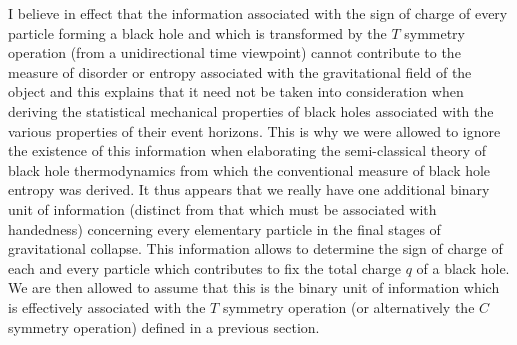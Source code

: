 \documentclass[notitlepage,12pt]{report}
\begin{document}
I believe in effect that the information associated with the sign of charge of every particle forming a black hole and which is transformed by the $T$ symmetry operation (from a unidirectional time viewpoint) cannot contribute to the measure of disorder or entropy associated with the gravitational field of the object and this explains that it need not be taken into consideration when deriving the statistical mechanical properties of black holes associated with the various properties of their event horizons. This is why we were allowed to ignore the existence of this information when elaborating the semi-classical theory of black hole thermodynamics from which the conventional measure of black hole entropy was derived. It thus appears that we really have one additional binary unit of information (distinct from that which must be associated with handedness) concerning every elementary particle in the final stages of gravitational collapse. This information allows to determine the sign of charge of each and every particle which contributes to fix the total charge $q$ of a black hole. We are then allowed to assume that this is the binary unit of information which is effectively associated with the $T$ symmetry operation (or alternatively the $C$ symmetry operation) defined in a previous section.
\end{document}

